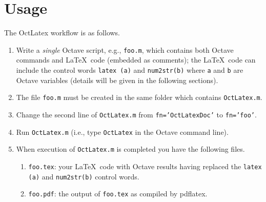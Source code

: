 \documentclass{article}
\begin{document}
 \section{Usage}
 The \textsf{OctLatex} workflow is as follows. 
 \begin{enumerate}
 \item Write a \emph{single} \textsf{Octave} script, e.g., \texttt{foo.m}, 
 which contains both \textsf{Octave} commands and \LaTeX\  code (embedded as comments);
 the \LaTeX\  code can include the control words \texttt{latex (a)} and \texttt{num2str(b)} 
 where \texttt{a} and \texttt{b} are \textsf{Octave} variables (details will be given in the following sections).    
 \item The file \texttt{foo.m} must be created in the same folder which contains \texttt{OctLatex.m}.
 \item Change the second line of \texttt{OctLatex.m} from \texttt{fn='OctLatexDoc'} to \texttt{fn='foo'}.
 \item Run \texttt{OctLatex.m} (i.e., type \texttt{OctLatex} in the \textsf{Octave} command line).
 \item When execution of \texttt{OctLatex.m} is completed you have the following files.
 \begin{enumerate}  
 \item \texttt{foo.tex}: your \LaTeX\  code with \textsf{Octave} results having replaced
 the \texttt{latex (a)} and \texttt{num2str(b)} control words.
 \item \texttt{foo.pdf}: the output of \texttt{foo.tex} as compiled by \textsf{pdflatex}.
 \end{enumerate}
 \end{enumerate}
 
\end{document}
